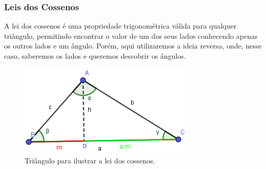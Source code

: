 \documentclass[a4paper,12pt]{article}
\begin{document}
	\subsubsection*{Leis dos Cossenos}

	A lei dos cossenos é uma propriedade trigonométrica válida para qualquer triângulo, permitindo encontrar o valor de um dos seus lados conhecendo apenas os outros lados e um ângulo. Porém, aqui utilizaremos a ideia reversa, onde, nesse caso, saberemos os lados e queremos descobrir os ângulos.
		\begin{figure}[H]
		\begin{center}
			\includegraphics[width=0.50\linewidth]{triangulo.png}
		\end{center}
		\caption{Triângulo para ilustrar a lei dos cossenos.}
		\label{fig:coslaw}
	\end{figure}
\end{document}
